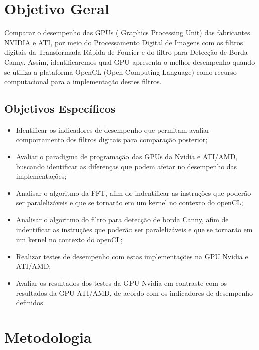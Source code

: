 \section{Objetivo Geral}

Comparar o desempenho das GPUs ( Graphics Processing Unit) das fabricantes NVIDIA e ATI, por meio do Processamento Digital de Imagens com os filtros digitais da Transformada Rápida de Fourier e do filtro para Detecção de Borda Canny. Assim,  identificaremos 	qual GPU apresenta o melhor desempenho quando se utiliza a plataforma OpenCL (Open Computing Language) como recurso computacional para a implementação destes filtros.
\subsection{Objetivos Específicos}
\begin{itemize}
\item Identificar os indicadores de desempenho que permitam avaliar comportamento dos filtros digitais para comparação posterior;
\item Avaliar o paradigma de programação das GPUs da Nvidia e ATI/AMD, buscando identificar as diferenças que podem afetar no desempenho das implementações;
\item Analisar o algoritmo da FFT, afim de indentificar as instruções que poderão ser paralelizáveis e que se tornarão em um kernel no contexto do openCL;
\item Analisar o algoritmo do filtro para detecção de borda Canny, afim de indentificar as instruções que poderão ser paralelizáveis e que se tornarão em um kernel no contexto do openCL;
\item Realizar testes de desempenho com estas implementações na GPU Nvidia e ATI/AMD;
\item Avaliar os resultados dos testes da GPU Nvidia em contraste com os resultados da GPU ATI/AMD, de acordo com os indicadores de desempenho definidos.
\end{itemize}

\section{Metodologia}

